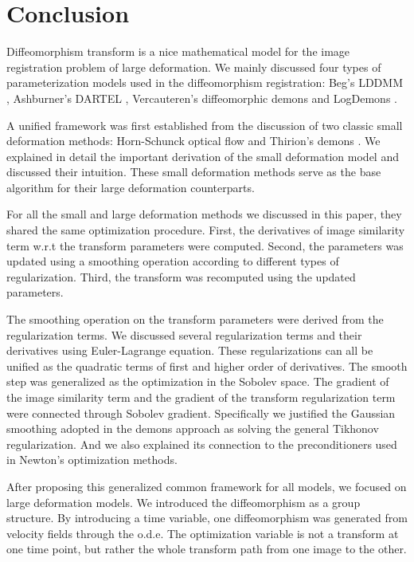 \documentclass[letterpaper,12pt]{article}
\begin{document}
 

\section{Conclusion}

Diffeomorphism transform is a nice mathematical model for the image registration problem of large deformation.  We mainly discussed four types of parameterization models used in the diffeomorphism registration: Beg's LDDMM \cite{Beg2005Computing}, Ashburner's DARTEL \cite{Ashburner2007}, Vercauteren's diffeomorphic demons \cite{Vercauteren2009} and LogDemons \cite{Vercauteren2008Symmetric}. 

A unified framework was first established from the discussion of two classic small deformation methods: Horn-Schunck optical flow \cite{Horn1981} and Thirion's demons \cite{Thirion98}. We explained in detail the important derivation of the small deformation model and discussed their intuition. These small deformation methods serve as the base algorithm for their large deformation counterparts.

For all the small and large deformation methods we discussed in this paper, they shared the same optimization procedure. First, the derivatives of image similarity term w.r.t the transform parameters were computed. Second, the parameters was updated using a smoothing operation according to different types of regularization. Third, the transform was recomputed using the updated parameters. 


The smoothing operation on the transform parameters were derived from the regularization terms. We discussed several regularization terms and their derivatives using Euler-Lagrange equation. These regularizations can all be unified as the quadratic terms of first and higher order of derivatives. 
The smooth step was generalized as the optimization in the Sobolev space. The gradient of the image similarity term and the gradient of the transform regularization term were connected through Sobolev gradient.  Specifically we justified the Gaussian smoothing adopted in the demons approach as solving the general Tikhonov regularization. 
And we also explained its connection to the preconditioners used in Newton's optimization methods.

After proposing this generalized common framework for all models, we focused on large deformation models. We introduced the diffeomorphism as a group structure. By introducing a time variable, one diffeomorphism was generated from velocity fields through the o.d.e. The optimization variable is not a transform at one time point, but rather the whole transform path from one image to the other. 
\end{document}
